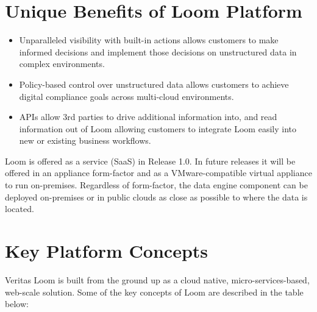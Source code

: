 \documentclass[letterpaper,10pt,english]{sphinxhowto}
\begin{document}
\section{Unique Benefits of Loom Platform}
\label{\detokenize{col/ds/mcdmp_ds_alpha2:mcdmp-ds-alpha2}}\label{\detokenize{col/ds/mcdmp_ds_alpha2:unique-benefits-of-loom-platform}}\label{\detokenize{col/ds/mcdmp_ds_alpha2:loom-alpha2-datasheet}}\begin{itemize}
\item {} 
Unparalleled visibility with built-in actions allows customers to make informed decisions and implement those decisions on unstructured data in complex environments.

\item {} 
Policy-based control over unstructured data allows customers to achieve digital compliance goals across multi-cloud environments.

\item {} 
APIs allow 3rd parties to drive additional information into, and read information out of Loom allowing customers to integrate Loom easily into new or existing business workflows.

\end{itemize}

Loom is offered as a service (SaaS) in Release 1.0. In future releases it will be offered in an appliance form-factor and as a VMware-compatible virtual appliance to run on-premises. Regardless of form-factor, the data engine component can be deployed on-premises or in public clouds \textendash{} as close as possible to where the data is located.


\section{Key Platform Concepts}
\label{\detokenize{col/ds/mcdmp_ds_alpha2:key-platform-concepts}}
Veritas Loom is built from the ground up as a cloud native, micro-services-based, web-scale solution. Some of the key concepts of Loom are described in the table below:
\end{document}
